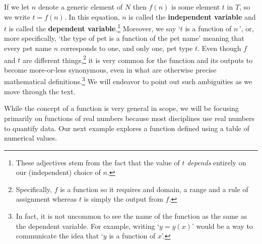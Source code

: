 If we let $n$ denote a generic element of $N$ then $f(n)$ is some element $t$ in $T$, so we write $t = f(n)$.  In this equation, $n$ is called the \textbf{independent variable} and $t$ is called the  \textbf{dependent variable}.\footnote{These adjectives stem from the fact that the value of $t$ \textit{depends} entirely on our (independent) choice of $n$.}    Moreover, we say `$t$ is a function of $n\,$',  or, more specifically, `the type of pet is a function of the pet name'  meaning that every pet name $n$ corresponds to one, and only one, pet type $t$.   Even though $f$ and $t$ are different things,\footnote{Specifically, $f$ is a function so it requires and domain, a range and a rule of assignment whereas $t$ is simply the output from $f$.} it is very common for the  function and its outputs to become more-or-less synonymous, even in what are otherwise precise mathematical definitions.\footnote{In fact, it is not uncommon to see the name of the function as the same as the dependent variable. For example, writing `$y = y(x)$'  would be a way to communicate the idea that `$y$ is a function of $x$'.}  We will endeavor to point out such ambiguities as we move through the text.

While the concept of a function is very general in scope, we will be focusing primarily on functions of real numbers because most disciplines use real numbers to quantify data.  Our next example explores a function defined using a table of numerical values.

